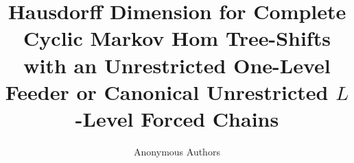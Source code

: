 \documentclass[11pt,a4paper]{article}
\title{Hausdorff Dimension for Complete Cyclic Markov Hom Tree-Shifts\\
with an Unrestricted One-Level Feeder or Canonical Unrestricted
$L$-Level Forced Chains}
\author{Anonymous Authors}
\date{}
\begin{document}
\maketitle

\begin{abstract}

\end{abstract}











\appendix





\end{document}
